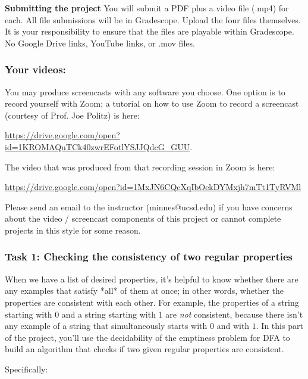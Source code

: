 \documentclass[12pt, oneside]{article}
\begin{document}
{\bf Submitting the project} You will submit a PDF plus a video file (.mp4) for each. All file submissions will be in Gradescope. Upload the four files themselves. It is your responsibility to ensure that the files are playable within Gradescope. No Google Drive links, YouTube links, or .mov files.

\newpage
\subsubsection*{Your videos:} You may produce screencasts 
with any software you choose. 
One option is to record yourself with Zoom; a tutorial on how to use 
Zoom to record a 
screencast (courtesy of Prof. Joe Politz)  is here: 

\url{https://drive.google.com/open?id=1KROMAQuTCk40zwrEFotlYSJJQdcG_GUU}.

The video that was produced from that recording session in Zoom is here:

\url{https://drive.google.com/open?id=1MxJN6CQcXqIbOekDYMxjh7mTt1TyRVMl}

Please send an email to the instructor 
(minnes@ucsd.edu) if you have 
concerns about  the video / screencast components of this project or 
cannot complete projects in this style for some reason.

\vspace{-20pt}

\subsubsection*{Task 1: Checking the consistency of two regular properties}

When we have a list of desired properties, it's helpful to know whether there 
are any examples that satisfy *all* of them at once; 
in other words, whether the  properties are 
consistent with each other. For example, the properties of 
a string starting with $0$ and a string starting with $1$ are {\it not} consistent, 
because there isn't any example of a string that simultaneously starts with $0$ and with $1$.
In this part of the 
project, you'll use the decidability of the emptiness problem for DFA to 
build an algorithm that checks if two given regular properties are consistent.

Specifically:

\vspace{-20pt}
\end{document}
